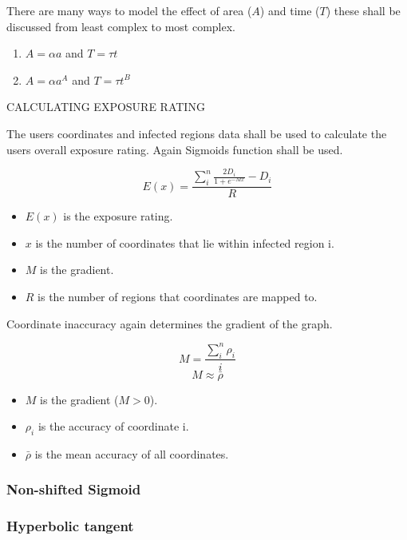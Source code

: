 \documentclass[a4paper,open right,12pt]{report}
\begin{document}
There are many ways to model the effect of area ($A$) and time ($T$) these shall be discussed from least complex to most complex.

\begin{enumerate}
    \item $A=\alpha a$ and $T=\tau t$
    \item $A=\alpha a^{A}$ and $T=\tau t^{B}$
\end{enumerate}

CALCULATING EXPOSURE RATING

The users coordinates and infected regions data shall be used to calculate the users overall exposure rating. Again Sigmoids function shall be used.

\begin{equation}
    E(x)=\frac{\sum_{i}^n{\frac{2D_{i}}{1+e^{-Mx}}-D_{i}}}{R}
\end{equation}
\begin{itemize}
    \item $E(x)$ is the exposure rating.
    \item $x$ is the number of coordinates that lie within infected region i.
    \item $M$ is the gradient.
    \item $R$ is the number of regions that coordinates are mapped to.
\end{itemize}

Coordinate inaccuracy again determines the gradient of the graph.

\begin{equation} \label{Equation:Gradient1}
    M=\frac{\sum_{i}^n\rho_{i}}{i}
\end{equation}
\begin{equation} \label{Equation:Gradient2}
    M\approx\bar{\rho}
\end{equation}
\begin{itemize}
    \item $M$ is the gradient ($M > 0$).
    \item $\rho_{i}$ is the accuracy of coordinate i.
    \item $\bar{\rho}$ is the mean accuracy of all coordinates.
\end{itemize}


\subsubsection{Non-shifted Sigmoid}
\subsubsection{Hyperbolic tangent}
\end{document}
